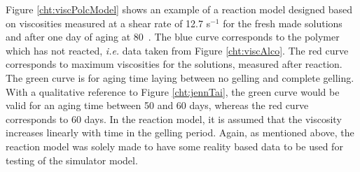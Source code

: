 \documentclass[nanomaterials,article,submit,moreauthors,pdftex]{Definitions/mdpi}
\begin{document}
Figure \ref{cht:viscPolcModel} shows an example of a reaction model designed based on viscosities measured at a shear rate of 12.7 s$^{-1}$ for the fresh made solutions and after one day of aging at 80~\celsius. The blue curve corresponds to the polymer which has not reacted, \textit{i.e.} data taken from Figure \ref{cht:viscAlco}. The red curve corresponds to maximum viscosities for the solutions, measured after reaction. The green curve is for aging time laying between no gelling and complete gelling. With a qualitative reference to Figure \ref{cht:jennTai}, the green curve would be valid for an aging time between 50 and 60 days, whereas the red curve corresponds to 60 days. In the reaction model, it is assumed that the viscosity increases linearly with time in the gelling period. Again, as mentioned above, the reaction model was solely made to have some reality based data to be used for testing of the simulator model. 
\end{document}
